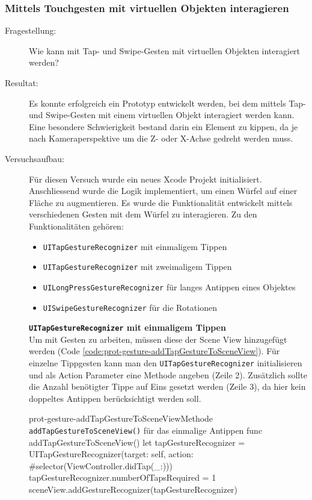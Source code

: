 \subsubsection{Mittels Touchgesten mit virtuellen Objekten interagieren}\label{subsub:prot-interagieren}
\begin{description}
	\item[Fragestellung:] Wie kann mit Tap- und Swipe-Gesten mit virtuellen Objekten interagiert werden?
	\item[Resultat:] Es konnte erfolgreich ein Prototyp entwickelt werden, bei dem mittels Tap- und Swipe-Gesten mit einem virtuellen Objekt interagiert werden kann. Eine besondere Schwierigkeit bestand darin ein Element zu kippen, da je nach Kameraperspektive um die Z- oder X-Achse gedreht werden muss. 
    \item[Versuchsaufbau:] Für diesen Versuch wurde ein neues Xcode Projekt initialisiert. Anschliessend wurde die Logik implementiert, um einen Würfel auf einer Fläche zu augmentieren. Es wurde die Funktionalität entwickelt mittels verschiedenen Gesten mit dem Würfel zu interagieren. Zu den Funktionalitäten gehören:

    \begin{itemize}
        \item \texttt{UITapGestureRecognizer} mit einmaligem Tippen
        \item \texttt{UITapGestureRecognizer} mit zweimaligem Tippen
        \item \texttt{UILongPressGestureRecognizer} für langes Antippen eines Objektes
        \item \texttt{UISwipeGestureRecognizer} für die Rotationen
    \end{itemize}

    \textbf{\texttt{UITapGestureRecognizer} mit einmaligem Tippen}\\
    Um mit Gesten zu arbeiten, müssen diese der Scene View hinzugefügt werden (Code \ref{code:prot-gesture-addTapGestureToSceneView}). Für einzelne Tippgesten kann man den \texttt{UITapGestureRecognizer} initialisieren und als Action Parameter eine Methode angeben (Zeile 2). Zusätzlich sollte die Anzahl benötigter Tippe auf Eins gesetzt werden (Zeile 3), da hier kein doppeltes Antippen berücksichtigt werden soll. 

    \begin{code}{prot-gesture-addTapGestureToSceneView}{Methode \texttt{addTapGestureToSceneView()} für das einmalige Antippen}
    func addTapGestureToSceneView() {
        let tapGestureRecognizer = UITapGestureRecognizer(target: self, action: #selector(ViewController.didTap(\_:)))
        tapGestureRecognizer.numberOfTapsRequired = 1
        sceneView.addGestureRecognizer(tapGestureRecognizer)
    }
    \end{code}


\end{description}
